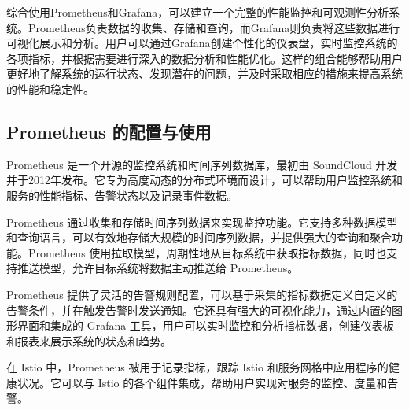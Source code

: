 综合使用Prometheus和Grafana，可以建立一个完整的性能监控和可观测性分析系统。Prometheus负责数据的收集、存储和查询，而Grafana则负责将这些数据进行可视化展示和分析。用户可以通过Grafana创建个性化的仪表盘，实时监控系统的各项指标，并根据需要进行深入的数据分析和性能优化。这样的组合能够帮助用户更好地了解系统的运行状态、发现潜在的问题，并及时采取相应的措施来提高系统的性能和稳定性。
\subsection{Prometheus 的配置与使用}
Prometheus 是一个开源的监控系统和时间序列数据库，最初由 SoundCloud 开发并于2012年发布。它专为高度动态的分布式环境而设计，可以帮助用户监控系统和服务的性能指标、告警状态以及记录事件数据。

Prometheus 通过收集和存储时间序列数据来实现监控功能。它支持多种数据模型和查询语言，可以有效地存储大规模的时间序列数据，并提供强大的查询和聚合功能。Prometheus 使用拉取模型，周期性地从目标系统中获取指标数据，同时也支持推送模型，允许目标系统将数据主动推送给 Prometheus。

Prometheus 提供了灵活的告警规则配置，可以基于采集的指标数据定义自定义的告警条件，并在触发告警时发送通知。它还具有强大的可视化能力，通过内置的图形界面和集成的 Grafana 工具，用户可以实时监控和分析指标数据，创建仪表板和报表来展示系统的状态和趋势。

在 Istio 中，Prometheus 被用于记录指标，跟踪 Istio 和服务网格中应用程序的健康状况。它可以与 Istio 的各个组件集成，帮助用户实现对服务的监控、度量和告警。

